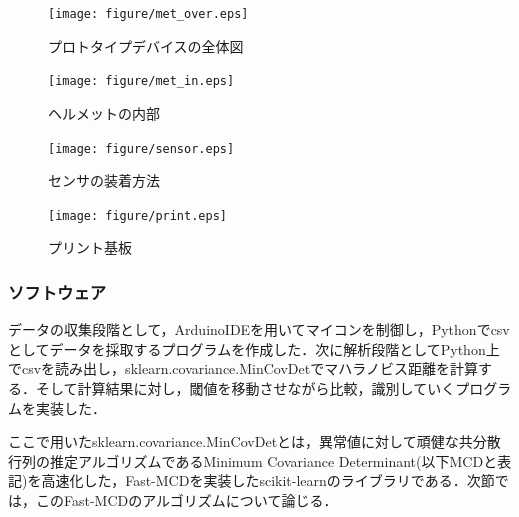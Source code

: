 \documentclass[Japanese]{dicomopapers}
\begin{document}
\begin{figure}[!t]
  \begin{center}
    \texttt{[image: figure/met\_over.eps]}
  \end{center}
    \vspace{-8mm}
  \caption{プロトタイプデバイスの全体図}
  \label{met_over}
\end{figure}

\begin{figure}[!t]
  \begin{center}
    \texttt{[image: figure/met\_in.eps]}
  \end{center}
    \vspace{-8mm}
  \caption{ヘルメットの内部}
  \label{met_in}
\end{figure}

\begin{figure}[!t]
  \begin{center}
    \texttt{[image: figure/sensor.eps]}
  \end{center}
    \vspace{-8mm}
  \caption{センサの装着方法}
  \label{sensor}
\end{figure}

\begin{figure}[!t]
  \begin{center}
    \texttt{[image: figure/print.eps]}
  \end{center}
    \vspace{-8mm}
  \caption{プリント基板}
  \label{print}
\end{figure}

\subsubsection{ソフトウェア}
データの収集段階として，ArduinoIDEを用いてマイコンを制御し，Pythonでcsvとしてデータを採取するプログラムを作成した．次に解析段階としてPython上でcsvを読み出し，sklearn.covariance.MinCovDetでマハラノビス距離を計算する．そして計算結果に対し，閾値を移動させながら比較，識別していくプログラムを実装した．\par
ここで用いたsklearn.covariance.MinCovDetとは，異常値に対して頑健な共分散行列の推定アルゴリズムであるMinimum Covariance Determinant(以下MCDと表記)を高速化した，Fast-MCDを実装したscikit-learnのライブラリである．次節では，このFast-MCDのアルゴリズムについて論じる．
\end{document}

